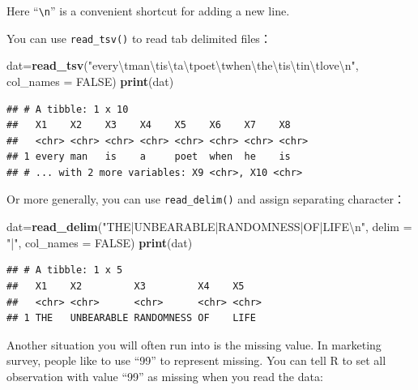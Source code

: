 \documentclass[12pt,]{krantz}
\newenvironment{Shaded}{\begin{snugshade}}{\end{snugshade}}
\newcommand{\KeywordTok}[1]{\textcolor[rgb]{0.13,0.29,0.53}{\textbf{#1}}}
\newcommand{\DataTypeTok}[1]{\textcolor[rgb]{0.13,0.29,0.53}{#1}}
\newcommand{\CharTok}[1]{\textcolor[rgb]{0.31,0.60,0.02}{#1}}
\newcommand{\StringTok}[1]{\textcolor[rgb]{0.31,0.60,0.02}{#1}}
\newcommand{\OtherTok}[1]{\textcolor[rgb]{0.56,0.35,0.01}{#1}}
\newcommand{\NormalTok}[1]{#1}
\theoremstyle{definition}
\theoremstyle{definition}
\theoremstyle{definition}
\theoremstyle{remark}
\begin{document}
Here ``\texttt{\textbackslash{}n}'' is a convenient shortcut for adding
a new line.

You can use \texttt{read\_tsv()} to read tab delimited files：

\begin{Shaded}
\begin{Highlighting}[]
\NormalTok{dat=}\KeywordTok{read_tsv}\NormalTok{(}\StringTok{"every}\CharTok{\textbackslash{}t}\StringTok{man}\CharTok{\textbackslash{}t}\StringTok{is}\CharTok{\textbackslash{}t}\StringTok{a}\CharTok{\textbackslash{}t}\StringTok{poet}\CharTok{\textbackslash{}t}\StringTok{when}\CharTok{\textbackslash{}t}\StringTok{he}\CharTok{\textbackslash{}t}\StringTok{is}\CharTok{\textbackslash{}t}\StringTok{in}\CharTok{\textbackslash{}t}\StringTok{love}\CharTok{\textbackslash{}n}\StringTok{"}\NormalTok{, }\DataTypeTok{col_names =} \OtherTok{FALSE}\NormalTok{)}
\KeywordTok{print}\NormalTok{(dat)}
\end{Highlighting}
\end{Shaded}

\begin{verbatim}
## # A tibble: 1 x 10
##   X1    X2    X3    X4    X5    X6    X7    X8   
##   <chr> <chr> <chr> <chr> <chr> <chr> <chr> <chr>
## 1 every man   is    a     poet  when  he    is   
## # ... with 2 more variables: X9 <chr>, X10 <chr>
\end{verbatim}

Or more generally, you can use \texttt{read\_delim()} and assign
separating character：

\begin{Shaded}
\begin{Highlighting}[]
\NormalTok{dat=}\KeywordTok{read_delim}\NormalTok{(}\StringTok{"THE|UNBEARABLE|RANDOMNESS|OF|LIFE}\CharTok{\textbackslash{}n}\StringTok{"}\NormalTok{, }\DataTypeTok{delim =} \StringTok{"|"}\NormalTok{, }\DataTypeTok{col_names =} \OtherTok{FALSE}\NormalTok{)}
\KeywordTok{print}\NormalTok{(dat)}
\end{Highlighting}
\end{Shaded}

\begin{verbatim}
## # A tibble: 1 x 5
##   X1    X2         X3         X4    X5   
##   <chr> <chr>      <chr>      <chr> <chr>
## 1 THE   UNBEARABLE RANDOMNESS OF    LIFE
\end{verbatim}

Another situation you will often run into is the missing value. In
marketing survey, people like to use ``99'' to represent missing. You
can tell R to set all observation with value ``99'' as missing when you
read the data:
\end{document}
